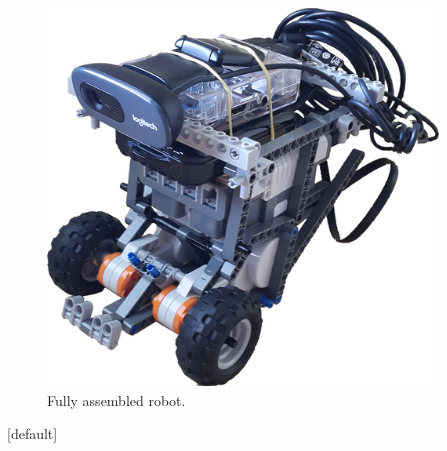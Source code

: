 \documentclass[final,hyperref={pdfpagelabels=false},notheorems]{beamer}
\theoremstyle{thesisstyle}
\begin{document}
\begin{frame}[t]
\begin{columns}[t]
\begin{column}{.5\textwidth}
\begin{block}{}
      \begin{figure}
        \centering\includegraphics[height=10cm]{imgs/robot.png}
        \caption{Fully assembled robot.}
      \end{figure}
      \vskip -1cm
    \end{block}
    [default]


\end{column}
\end{columns}
\end{frame}
\end{document}

